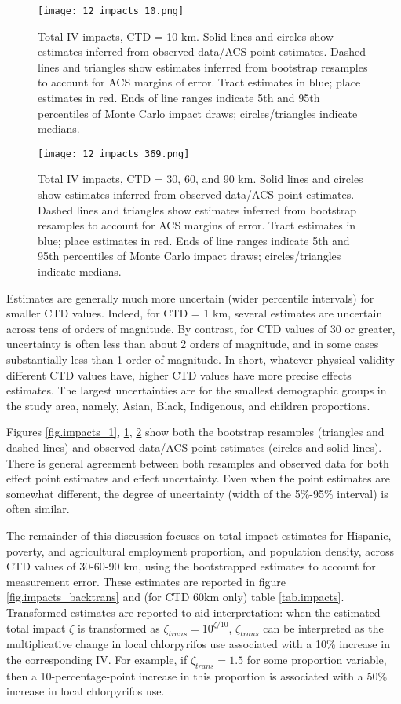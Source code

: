 \documentclass[ijerph,article,submit,oneauthor,pdftex]{Definitions/mdpi}
\begin{document}
\begin{figure}
\centering
\texttt{[image: 12\_impacts\_10.png]}
\caption{Total IV impacts, CTD = 10 km. Solid lines and circles show estimates inferred from observed data/ACS point estimates. Dashed lines and triangles show estimates inferred from bootstrap resamples to account for ACS margins of error. Tract estimates in blue; place estimates in red. Ends of line ranges indicate 5th and 95th percentiles of Monte Carlo impact draws; circles/triangles indicate medians.\label{fig.impacts_10}}
\end{figure}

\begin{figure}
\centering
\texttt{[image: 12\_impacts\_369.png]}
\caption{Total IV impacts, CTD = 30, 60, and 90 km. Solid lines and circles show estimates inferred from observed data/ACS point estimates. Dashed lines and triangles show estimates inferred from bootstrap resamples to account for ACS margins of error. Tract estimates in blue; place estimates in red. Ends of line ranges indicate 5th and 95th percentiles of Monte Carlo impact draws; circles/triangles indicate medians.\label{fig.impacts_369}}
\end{figure}

Estimates are generally much more uncertain (wider percentile intervals) for smaller CTD values. Indeed, for CTD = 1 km, several estimates are uncertain across tens of orders of magnitude. By contrast, for CTD values of 30 or greater, uncertainty is often less than about 2 orders of magnitude, and in some cases substantially less than 1 order of magnitude. In short, whatever physical validity different CTD values have, higher CTD values have more precise effects estimates. The largest uncertainties are for the smallest demographic groups in the study area, namely, Asian, Black, Indigenous, and children proportions.

Figures \ref{fig.impacts_1}, \ref{fig.impacts_10}, \ref{fig.impacts_369} show both the bootstrap resamples (triangles and dashed lines) and observed data/ACS point estimates (circles and solid lines). There is general agreement between both resamples and observed data for both effect point estimates and effect uncertainty. Even when the point estimates are somewhat different, the degree of uncertainty (width of the 5\%-95\% interval) is often similar.

The remainder of this discussion focuses on total impact estimates for Hispanic, poverty, and agricultural employment proportion, and population density, across CTD values of 30-60-90 km, using the bootstrapped estimates to account for measurement error. These estimates are reported in figure \ref{fig.impacts_backtrans} and (for CTD 60km only) table \ref{tab.impacts}. Transformed estimates are reported to aid interpretation: when the estimated total impact \(\zeta\) is transformed as \(\zeta_{trans} = 10^{\zeta/10}\), \(\zeta_{trans}\) can be interpreted as the multiplicative change in local chlorpyrifos use associated with a 10\% increase in the corresponding IV. For example, if \(\zeta_{trans} = 1.5\) for some proportion variable, then a 10-percentage-point increase in this proportion is associated with a 50\% increase in local chlorpyrifos use.
\end{document}
